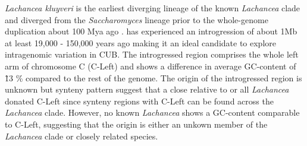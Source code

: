 \documentclass[12pt]{article}
\begin{document}

\textit{Lachancea kluyveri} is the earliest diverging lineage of the known \textit{Lachancea} clade and diverged from the \textit{Saccharomyces} lineage prior to the whole-genome duplication about 100 Mya ago \citep{wolfe1997}. 
\kluyveri has experienced an introgression of about 1Mb at least 19,000 - 150,000 years ago \citep{friedrich2015} making it an ideal candidate to explore intragenomic variation in CUB. 
The introgressed region comprises the whole left arm of chromosome C (C-Left) and shows a difference in average GC-content of \~ 13 \% compared to the rest of the \kluyveri genome.
The origin of the introgressed region is unknown but synteny pattern suggest that a close relative to \kluyveri or all \textit{Lachancea} donated C-Left \citep{payen2009} since synteny regions with C-Left can be found across the \textit{Lachancea} clade.
However, no known \textit{Lachancea} shows a GC-content comparable to C-Left, suggesting that the origin is either an unkown member of the \textit{Lachancea} clade or closely related species.
\end{document}
